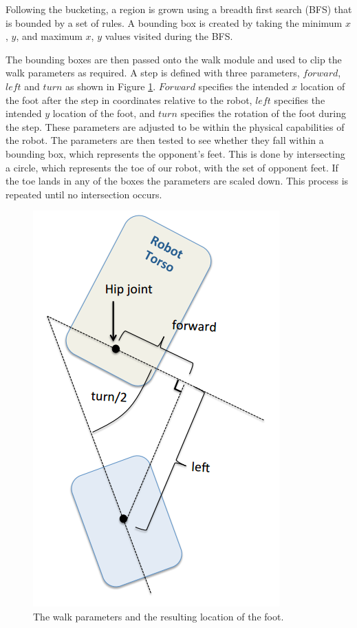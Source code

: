 \documentclass[runningheads,a4paper]{llncs}
\begin{document}
Following the bucketing, a region is grown using a breadth first search (BFS) that is bounded by a set of rules. A bounding box is created by taking the minimum $x$, $y$, and maximum $x$, $y$ values visited during the BFS.

The bounding boxes are then passed onto the walk module and used to clip the walk parameters as required. A step is defined with three parameters, $forward$, $left$ and $turn$ as shown in Figure \ref{figWalkParam}. $Forward$ specifies the intended $x$ location of the foot after the step in coordinates relative to the robot, $left$ specifies the intended $y$ location of the foot, and $turn$ specifies the rotation of the foot during the step. These parameters are adjusted to be within the physical capabilities of the robot. The parameters are then tested to see whether they fall within a bounding box, which represents the opponent's feet. This is done by intersecting a circle, which represents the toe of our robot, with the set of opponent feet. If the toe lands in any of the boxes the parameters are scaled down. This process is repeated until no intersection occurs.

\begin{figure}
\centering
\includegraphics[scale=0.3]{Figures/figWalkParam}
\caption{
   The walk parameters and the resulting location of the foot.
}
\label{figWalkParam}
\end{figure}
\end{document}
